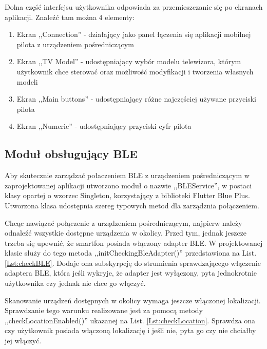 \documentclass[12pt,twoside,draft]{article}
\begin{document}
Dolna część interfejsu użytkownika odpowiada za przemieszczanie się po ekranach aplikacji. Znaleźć tam można 4 elementy:
\begin{enumerate}[label=\alph*), leftmargin=1.25cm]
   \item Ekran ,,Connection'' - działający jako panel łączenia się aplikacji mobilnej pilota z urządzeniem pośredniczącym
   \item Ekran ,,TV Model'' - udostępniający wybór modelu telewizora, którym użytkownik chce sterować oraz możliwość modyfikacji i tworzenia własnych modeli
   \item Ekran ,,Main buttons'' - udostępniający różne najczęściej używane przyciski pilota
   \item Ekran ,,Numeric'' - udostępniający przyciski cyfr pilota
\end{enumerate}

\subsection{Moduł obsługujący BLE}
Aby skutecznie zarządzać połaczeniem BLE z urządzeniem pośredniczącym w zaprojektowanej aplikacji utworzono moduł o nazwie ,,BLEService'', w postaci klasy opartej o wzorzec Singleton, korzystający z biblioteki Flutter Blue Plus\cite{flutterBluePlus}. Utworzona klasa udostępnia szereg typowych metod dla zarządznia połączeniem.

Chcąc nawiązać połączenie z urządzeniem pośredniczącym, najpierw należy odnaleźć wszystkie dostępne urządzenia w okolicy. Przed tym, jednak jeszcze trzeba się upewnić, że smartfon posiada włączony adapter BLE. W projektowanej klasie służy do tego metoda ,,initCheckingBleAdapter()'' przedstawiona na List. \ref*{Lst:checkBLE}. Dodaje ona subskyrpcję do strumienia sprawdzającego włączenie adaptera BLE, która jeśli wykryje, że adapter jest wyłączony, pyta jednokrotnie użytkownika czy jednak nie chce go włączyć.



Skanowanie urządzeń dostępnych w okolicy wymaga jeszcze włączonej lokalizacji. Sprawdzanie tego warunku realizowane jest za pomocą metody ,,checkLocationEnabled()'' ukazanej na List. \ref*{Lst:checkLocation}. Sprawdza ona czy użytkownik posiada włączoną lokalizację i jeśli nie, pyta go czy nie chciałby jej włączyć.


\end{document}

